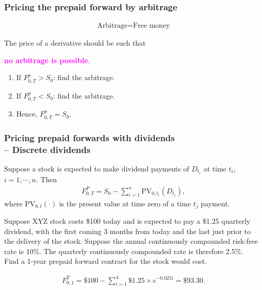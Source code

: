 \begin{frame}[fragile,t]
	\frametitle{Pricing the prepaid forward by arbitrage}

	\begin{align*}
		\text{Arbitrage} = \text{Free money}
	\end{align*}

	\begin{center}
		The price of a derivative should be such that

		\bigskip
		\textcolor{magenta}{\bf no arbitrage is possible}.
	\end{center}

	\bigskip
	\mySeparateLine
	\bigskip

	\begin{enumerate}
		\item If $F_{0,T}^p>S_0$: find the arbitrage.
			\bigskip
		\item If $F_{0,T}^p<S_0$: find the arbitrage.
			\bigskip
		\item[] Hence, $F_{0,T}^p=S_0$.
	\end{enumerate}
\end{frame}
\begin{frame}[fragile,t]
	\frametitle{Pricing prepaid forwards with dividends \\ -- Discrete dividends}
	Suppose a stock is expected to make dividend payments of $D_{t_i}$ at time $t_i$,  $i=1,\cdots,
	n$. Then
	\begin{align*}
		F_{0,T}^P = S_0- \sum_{i=1}^n \text{PV}_{0,t_i}\left(D_{t_i}\right),
	\end{align*}
	where $\text{PV}_{0,t}(\cdot)$ is the present value at time zero of  a time $t_j$ payment.
\end{frame}
\begin{frame}[fragile,t]
\begin{myexample}
	Suppose XYZ stock costs \$100 today and is expected to pay a \$1.25 quarterly dividend, with the
	first coming 3 months from today and the last just prior to the delivery of the stock. Suppose the
	annual continuously compounded risk-free rate is 10\%.  The quarterly continuously compounded rate
	is therefore 2.5\%.\\
	Find a 1-year prepaid forward contract for the stock would cost.
\end{myexample}
\pause
\begin{mysol}
\begin{align*}
	F_{0,1}^T = \$100 - \sum_{i=1}^4 \$1.25 \times e^{-0.025 i} = \$93.30.
\end{align*}
\myEnd
\end{mysol}
\end{frame}
